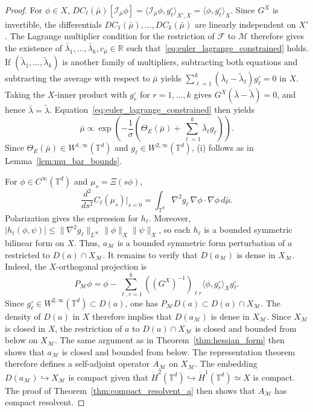 \documentclass[10pt,a4paper]{amsart}
\newcommand{\F}{\mathcal{F}}
\newcommand{\R}{\mathbb{R}}
\newcommand{\T}{\mathbb{T}}
\newcommand{\dotHk}[1][k]{\dot{H}^{#1}}
\newcommand{\rieszmap}[1][\mu]{\mathcal{I}_{#1}}
\begin{document}
\begin{proof}
    For $\phi \in X$, $DC_\ell(\bar\mu)[\rieszmap[\bar\mu]\phi] = \langle\rieszmap[\bar\mu]\phi,g_\ell^\circ\rangle_{X',X} = \langle\phi,g_\ell^\circ\rangle_X$.
    Since $G^X$ is invertible, the differentials $DC_1(\bar\mu), \ldots, DC_k(\bar\mu)$ are linearly independent on $X'$.
    The Lagrange multiplier condition for the restriction of $\F$ to $\mathcal{M}$ therefore gives the existence of $\bar\lambda_1, \ldots, \bar\lambda_k, c_{\bar\mu} \in \R$ such that~\eqref{eq:euler_lagrange_constrained} holds.
    If $(\widetilde\lambda_1, \ldots, \widetilde\lambda_k)$ is another family of multipliers, subtracting both equations and subtracting the average with respect to $\bar\mu$ yields $\sum_{\ell=1}^k(\bar\lambda_\ell - \widetilde\lambda_\ell) g_\ell^\circ = 0$ in $X$.
    Taking the $X$-inner product with $g_r^\circ$ for $r=1,\ldots,k$ gives $G^X(\bar\lambda - \widetilde\lambda) = 0$, and hence $\bar\lambda = \widetilde\lambda$.
    Equation~\eqref{eq:euler_lagrange_constrained} then yields
    \[
    \bar\mu \propto \exp\left(-\frac{1}{\sigma} \left( \Theta_E(\bar\mu)+\sum_{\ell=1}^k\bar\lambda_\ell g_\ell \right) \right).
    \]
    Since $\Theta_E(\bar\mu) \in W^{1,\infty}(\T^d)$ and $g_\ell \in W^{2,\infty}(\T^d)$, (i) follows as in Lemma~\ref{lem:mu_bar_bounds}.

    For $\phi \in C^{\infty}(\T^d)$ and $\mu_s = \Xi(s\phi)$,
    \[
    \frac{d^2}{ds^2} C_\ell(\mu_s)\Big|_{s=0} = \int_{\T^d}\nabla^2g_\ell\,\nabla\phi \cdot \nabla\phi \, d\bar\mu.
    \]
    Polarization gives the expression for $h_\ell$. Moreover, $|h_\ell(\phi,\psi)| \le \|\nabla^2g_\ell\|_{L^\infty} \|\phi\|_X \|\psi\|_X$, so each $h_\ell$ is a bounded symmetric bilinear form on $X$.
    Thus, $a_{\mathcal{M}}$ is a bounded symmetric form perturbation of $a$ restricted to $D(a) \cap X_{\mathcal{M}}$.
    It remains to verify that $D(a_{\mathcal{M}})$ is dense in $X_{\mathcal{M}}$.
    Indeed, the $X$-orthogonal projection is
    \[
    P_{\mathcal{M}}\phi = \phi - \sum_{\ell,r=1}^k ((G^X)^{-1})_{\ell r} \langle \phi,g_r^\circ \rangle_X g_\ell^\circ.
    \]
    Since $g_\ell^\circ \in W^{2,\infty}(\T^d) \subset D(a)$, one has $P_{\mathcal{M}}D(a) \subset D(a) \cap X_{\mathcal{M}}$. 
    The density of $D(a)$ in $X$ therefore implies that $D(a_{\mathcal{M}})$ is dense in $X_{\mathcal{M}}$.
    Since $X_{\mathcal{M}}$ is closed in $X$, the restriction of $a$ to $D(a) \cap X_{\mathcal{M}}$ is closed and bounded from below on $X_{\mathcal{M}}$.
    The same argument as in Theorem~\ref{thm:hessian_form} then shows that $a_{\mathcal{M}}$ is closed and bounded from below.
    The representation theorem therefore defines a self-adjoint operator $A_{\mathcal{M}}$ on $X_{\mathcal{M}}$.
    The embedding $D(a_{\mathcal{M}}) \hookrightarrow X_{\mathcal{M}}$ is compact given that $\dotHk[2](\T^d) \hookrightarrow \dotHk[1](\T^d) \simeq X$ is compact. 
    The proof of Theorem~\ref{thm:compact_resolvent_a} then shows that $A_{\mathcal{M}}$ has compact resolvent.


\end{proof}
\end{document}
